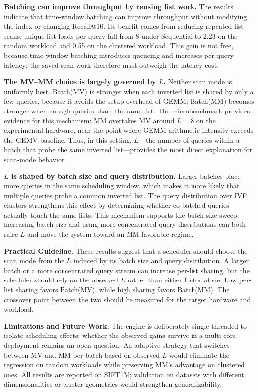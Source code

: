 \documentclass[sigconf, nonacm]{acmart}
\begin{document}
\textbf{Batching can improve throughput by reusing list work.}
The results indicate that time-window batching can improve throughput
without modifying the index or changing Recall@10. Its benefit comes
from reducing repeated list scans: unique list loads per query fall from
8 under Sequential to 2.23 on the random workload and 0.55 on the
clustered workload. This gain is not free, because time-window batching
introduces queueing and increases per-query latency; the saved scan work
therefore must outweigh the latency cost.

\textbf{The MV--MM choice is largely governed by $L$.}
Neither scan mode is uniformly best. Batch(MV) is stronger when each
inverted list is shared by only a few queries, because it avoids the
setup overhead of GEMM; Batch(MM) becomes stronger when enough queries
share the same list. The microbenchmark provides evidence for this
mechanism: MM overtakes MV around $L = 8$ on the experimental hardware,
near the point where GEMM arithmetic intensity exceeds the GEMV
baseline. Thus, in this setting, $L$---the number of queries within a
batch that probe the same inverted list---provides the most direct
explanation for scan-mode behavior.

\textbf{$L$ is shaped by batch size and query distribution.}
Larger batches place more queries in the same scheduling window, which
makes it more likely that multiple queries probe a common inverted list.
The query distribution over IVF clusters strengthens this effect by
determining whether co-batched queries actually touch the same lists.
This mechanism supports the batch-size sweep: increasing batch size and
using more concentrated query distributions can both raise $L$ and move
the system toward an MM-favorable regime.

\textbf{Practical Guideline.} These results suggest that a scheduler
should choose the scan mode from the $L$ induced by its batch size and
query distribution. A larger batch or a more concentrated query stream
can increase per-list sharing, but the scheduler should rely on the
observed $L$ rather than either factor alone. Low per-list sharing
favors Batch(MV), while high sharing favors Batch(MM). The crossover
point between the two should be measured for the target hardware and
workload.

\textbf{Limitations and Future Work.} The engine is deliberately
single-threaded to isolate scheduling effects; whether the observed gains
survive in a multi-core deployment remains an open question. An adaptive
strategy that switches between MV and MM per batch based on observed $L$
would eliminate the regression on random workloads while preserving
MM's advantage on clustered ones. All results are reported on SIFT1M;
validation on datasets with different dimensionalities or cluster
geometries would strengthen generalizability.



\end{document}
